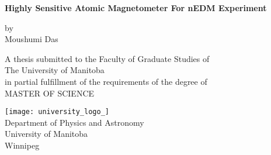 \documentclass[12pt]{report}
\begin{document}
\begin{titlepage}
    \begin{center}
        \vspace*{0.5cm}
        
        \large
        \textbf{Highly Sensitive Atomic Magnetometer For nEDM Experiment }
        
        \vspace{0.5cm}
        \large
        
        
        \vspace{1.5cm}
        by\\
        \vspace{0.9cm}
        Moushumi Das
        \vfill
        
%
       \vspace{1.5cm}
       A thesis submitted to the Faculty of Graduate Studies of\\ The University of Manitoba\\
       in partial fulfillment of the requirements of the degree of\\
        \vspace{1.2cm}
        MASTER OF SCIENCE
        \Large
        \vspace{0.8cm}
        
        \texttt{[image: university\_logo\_]}\\
        \large
        Department of Physics and Astronomy\\
        University of Manitoba\\
        Winnipeg
  
        
    \end{center}
\end{titlepage}
\end{document}
